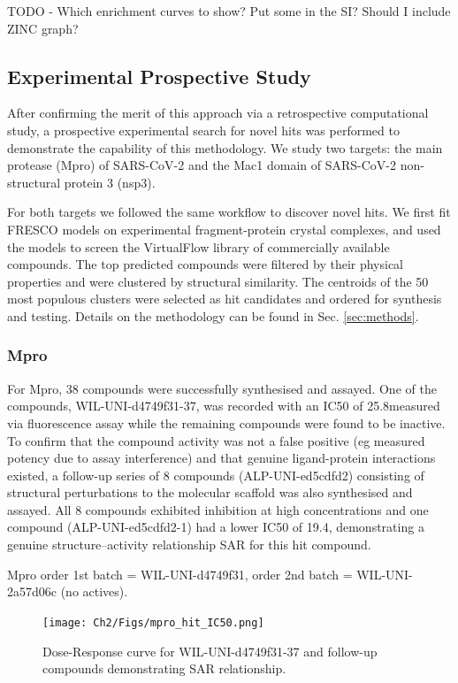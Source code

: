 TODO - Which enrichment curves to show? Put some in the SI? Should I include ZINC graph?

\subsection{Experimental Prospective Study}
After confirming the merit of this approach via a retrospective computational study, a prospective experimental search for novel hits was performed to demonstrate the capability of this methodology. We study two targets: the main protease (Mpro) of SARS-CoV-2 and the Mac1 domain of SARS-CoV-2 non-structural protein 3 (nsp3). 

For both targets we followed the same workflow to discover novel hits. We first fit FRESCO models on experimental fragment-protein crystal complexes, and used the models to screen the VirtualFlow \cite{Gorgulla2020VirtualFlow} library of commercially available compounds. The top predicted compounds were filtered by their physical properties and were clustered by structural similarity. The centroids of the 50 most populous clusters were selected as hit candidates and ordered for synthesis and testing. Details on the methodology can be found in Sec. \ref{sec:methods}.

\subsubsection{Mpro}
For Mpro, 38 compounds were successfully synthesised and assayed. One of the compounds, WIL-UNI-d4749f31-37, was recorded with an IC50 of 25.8\uM measured via fluorescence assay while the remaining compounds were found to be inactive. To confirm that the compound activity was not a false positive (eg measured potency due to assay interference) and that genuine ligand-protein interactions existed, a follow-up series of 8 compounds (ALP-UNI-ed5cdfd2) consisting of structural perturbations to the molecular scaffold was also synthesised and assayed. All 8 compounds exhibited inhibition at high concentrations and one compound (ALP-UNI-ed5cdfd2-1) had a lower IC50 of 19.4\uM, demonstrating a genuine structure–activity relationship SAR for this hit compound.

Mpro order 1st batch = WIL-UNI-d4749f31, order 2nd batch = WIL-UNI-2a57d06c (no actives). 

\begin{figure}
    \centering
    \texttt{[image: Ch2/Figs/mpro\_hit\_IC50.png]}
    \caption{Dose-Response curve for WIL-UNI-d4749f31-37 and follow-up compounds demonstrating SAR relationship.}
    \label{fig:mpro_hit}
\end{figure}

